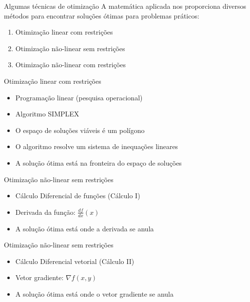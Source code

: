 \documentclass{beamer}
\begin{document}
\begin{frame}{Algumas técnicas de otimização}
A matemática aplicada nos proporciona diversos métodos para encontrar soluções ótimas para problemas práticos:

  \begin{enumerate}
  \item<2-> Otimização linear com restrições
  \item<3-> Otimização não-linear sem restrições
  \item<4-> Otimização não-linear com restrições
  \end{enumerate}
\end{frame}

\begin{frame}{Otimização linear com restrições}
  \begin{itemize}
  \item Programação linear (pesquisa operacional)
  \item Algoritmo SIMPLEX
  \item O espaço de soluções viáveis é um polígono
  \item O algoritmo resolve um sistema de inequações lineares
  \item A solução ótima está na fronteira do espaço de soluções
  \end{itemize}
\end{frame}

\begin{frame}{Otimização não-linear sem restrições}
  \begin{itemize}
  \item Cálculo Diferencial de funções (Cálculo I)
  \item Derivada da função: $\frac{d f}{d x}(x)$
  \item A solução ótima está onde a derivada se anula
  \end{itemize}
\end{frame}

\begin{frame}{Otimização não-linear sem restrições}
  \begin{itemize}
  \item Cálculo Diferencial vetorial (Cálculo II)
  \item Vetor gradiente: $\nabla f(x,y)$
  \item A solução ótima está onde o vetor gradiente se anula
  \end{itemize}
\end{frame}
\end{document}
